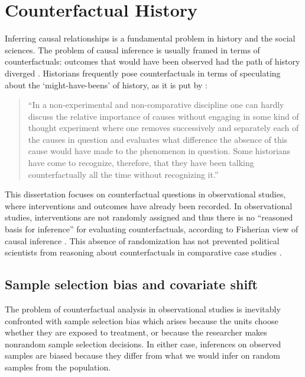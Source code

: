 \chapter{Counterfactual History} \label{counterfactual-history}

Inferring causal relationships is a fundamental problem in history and the social sciences. The problem of causal inference is usually framed in terms of counterfactuals: outcomes that would have been observed had the path of history diverged \citep{lewis2013counterfactuals,pearl2009causality,imbens2015causal}. Historians frequently pose counterfactuals in terms of speculating about the `might-have-beens' of history, as it is put by  \citet{elster1978logic}:

\begin{quote}
``In a non-experimental and non-comparative discipline one can hardly discuss the
relative importance of causes without engaging in some kind of thought experiment where one removes successively and separately each of the causes in
question and evaluates what difference the absence of this cause would have
made to the phenomenon in question. Some historians have come to recognize,
therefore, that they have been talking counterfactually all the time without
recognizing it.''
\end{quote}

This dissertation focuses on counterfactual questions in observational studies, where interventions and outcomes have already been recorded. In observational studies, interventions are not randomly assigned and thus there is no ``reasoned basis for inference'' for evaluating counterfactuals, according to Fisherian view of causal inference \citep{fisher1935}. This absence of randomization has not prevented political scientists from reasoning about counterfactuals in comparative case studies \citep{fearon1991counterfactuals, tetlock1996counterfactual,abadie2010synthetic,abadie2015comparative}.%

\section{Sample selection bias and covariate shift}
The problem of counterfactual analysis in observational studies is inevitably confronted with sample selection bias \citep{heckman1979sample} which arises because the units choose whether they are exposed to treatment, or because the researcher makes nonrandom sample selection decisions. In either case, inferences on observed samples are biased because they differ from what we would infer on random samples from the population. 

